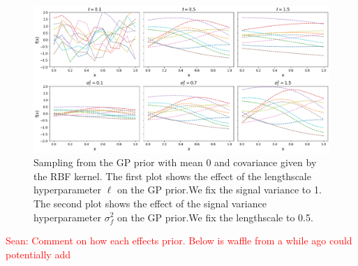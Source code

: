 \documentclass{ucdgradtaughtthesis}
\newcommand{\Sean}[1]{{\textcolor{red}{{Sean: #1}} }}
\begin{document}
\begin{figure}[H]
    \centering
        \includegraphics[width=\textwidth]{LatexPlots/1dplots/Kernel_hyperparams.png}
        \caption[Visualising the effect of kernel hyper-parameters.]{Sampling from the GP prior with mean 0 and covariance given by the RBF kernel.
        The first plot shows the effect of the lengthscale hyperparameter \(\ell\) on the GP prior.We fix the signal variance to 1.
        The second plot shows the effect of the signal variance hyperparameter \(\sigma_f^2\) on the GP prior.We fix the lengthscale to 0.5.}
    \label{fig: GPprior_hyperparams}
\end{figure}

\Sean{Comment on how each effects prior. Below is waffle from a while ago could potentially add}


\end{document}
